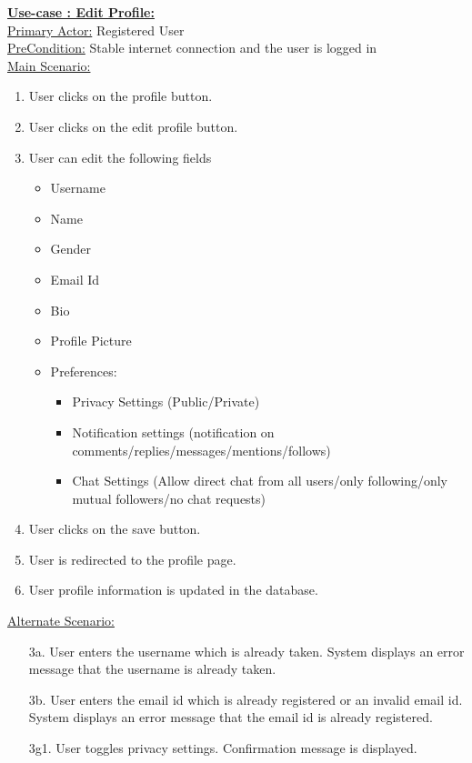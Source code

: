 \documentclass[conference,compsoc]{IEEEtran}
\newcounter{UC}
\newcommand{\nextU}{\stepcounter{UC}\theUC}
\begin{document}
\underline{\textbf{Use-case \nextU: Edit Profile:}}\\

\underline{Primary Actor:} Registered User\\

\underline{PreCondition:} Stable internet connection and the user is logged in\\

\underline{Main Scenario:}\\

\begin{enumerate}
    \item User clicks on the profile button.
    \item User clicks on the edit profile button.
    \item User can edit the following fields
          \begin{itemize}
              \item Username
              \item Name
              \item Gender
              \item Email Id
              \item Bio
              \item Profile Picture
              \item Preferences:
                    \begin{itemize}
                        \item Privacy Settings (Public/Private)
                        \item Notification settings (notification on comments/replies/messages/mentions/follows)
                        \item Chat Settings (Allow direct chat from all users/only following/only mutual followers/no chat requests)
                    \end{itemize}
          \end{itemize}
    \item User clicks on the save button.
    \item User is redirected to the profile page.
    \item User profile information is updated in the database.
\end{enumerate}

\underline{Alternate Scenario:}\\
\begin{enumerate}
    \item [3a.] User enters the username which is already taken. System displays an error message that the username is already taken.
    \item [3b.] User enters the email id which is already registered or an invalid email id. System displays an error message that the email id is already registered.
    \item [3g1.] User toggles privacy settings. Confirmation message is displayed.
\end{enumerate}\vspace{0.2cm}
\end{document}
